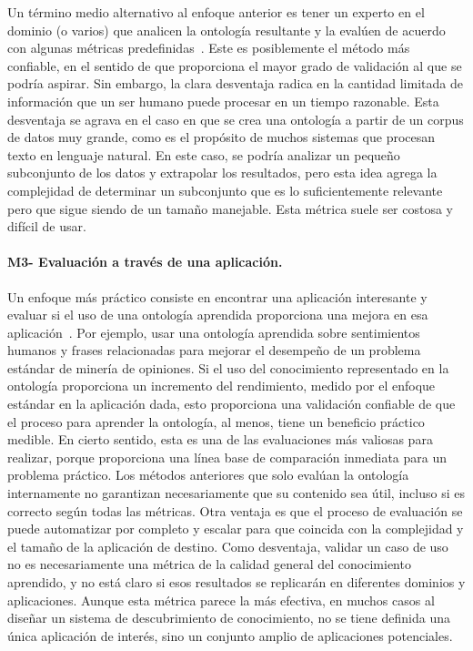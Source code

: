 Un término medio alternativo al enfoque anterior es tener un experto en el dominio (o varios) que analicen la ontología resultante y la evalúen de acuerdo con algunas métricas predefinidas~\cite{ROSPOCHER2016132}.
Este es posiblemente el método más confiable, en el sentido de que proporciona el mayor grado de validación al que se podría aspirar.
Sin embargo, la clara desventaja radica en la cantidad limitada de información que un ser humano puede procesar en un tiempo razonable.
Esta desventaja se agrava en el caso en que se crea una ontología a partir de un corpus de datos muy grande, como es el propósito de muchos sistemas que procesan texto en lenguaje natural.
En este caso, se podría analizar un pequeño subconjunto de los datos y extrapolar los resultados, pero esta idea agrega la complejidad de determinar un subconjunto que es lo suficientemente relevante pero que sigue siendo de un tamaño manejable.
Esta métrica suele ser costosa y difícil de usar.

\paragraph{M3- Evaluación a través de una aplicación.}

Un enfoque más práctico consiste en encontrar una aplicación interesante y evaluar si el uso de una ontología aprendida proporciona una mejora en esa aplicación~\cite{gurevych2003semantic}.
Por ejemplo, usar una ontología aprendida sobre sentimientos humanos y frases relacionadas para mejorar el desempeño de un problema estándar de minería de opiniones.
Si el uso del conocimiento representado en la ontología proporciona un incremento del rendimiento, medido por el enfoque estándar en la aplicación dada, esto proporciona una validación confiable de que el proceso para aprender la ontología, al menos, tiene un beneficio práctico medible.
En cierto sentido, esta es una de las evaluaciones más valiosas para realizar, porque proporciona una línea base de comparación inmediata para un problema práctico.
Los métodos anteriores que solo evalúan la ontología internamente no garantizan necesariamente que su contenido sea útil, incluso si es correcto según todas las métricas.
Otra ventaja es que el proceso de evaluación se puede automatizar por completo y escalar para que coincida con la complejidad y el tamaño de la aplicación de destino.
Como desventaja, validar un caso de uso no es necesariamente una métrica de la calidad general del conocimiento aprendido, y no está claro si esos resultados se replicarán en diferentes dominios y aplicaciones.
Aunque esta métrica parece la más efectiva, en muchos casos al diseñar un sistema de descubrimiento de conocimiento, no se tiene definida una única aplicación de interés, sino un conjunto amplio de aplicaciones potenciales.

